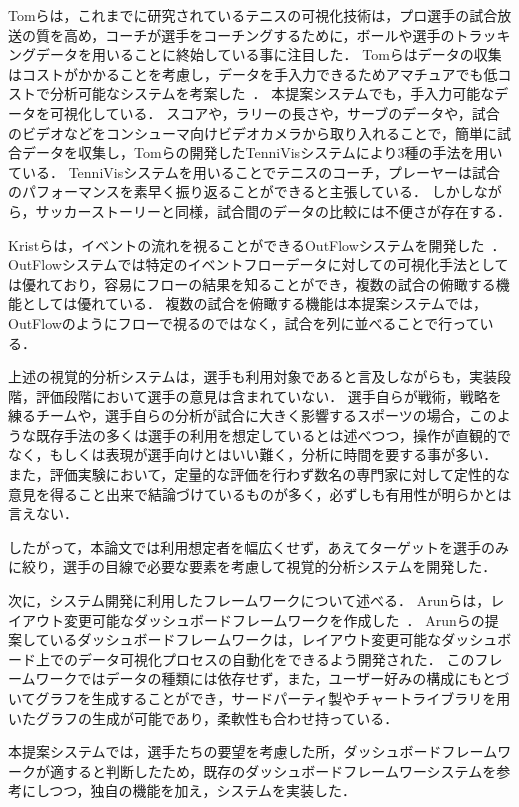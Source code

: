 \documentclass[sotsuron]{kuee}
\begin{document}
	Tomらは，これまでに研究されているテニスの可視化技術は，プロ選手の試合放送の質を高め，コーチが選手をコーチングするために，ボールや選手のトラッキングデータを用いることに終始している事に注目した．
	Tomらはデータの収集はコストがかかることを考慮し，データを手入力できるためアマチュアでも低コストで分析可能なシステムを考案した~\cite{TenniVis}．
	本提案システムでも，手入力可能なデータを可視化している．
	スコアや，ラリーの長さや，サーブのデータや，試合のビデオなどをコンシューマ向けビデオカメラから取り入れることで，簡単に試合データを収集し，Tomらの開発したTenniVisシステムにより3種の手法を用いている．
	TenniVisシステムを用いることでテニスのコーチ，プレーヤーは試合のパフォーマンスを素早く振り返ることができると主張している．
	しかしながら，サッカーストーリーと同様，試合間のデータの比較には不便さが存在する．
	
	Kristらは，イベントの流れを視ることができるOutFlowシステムを開発した~\cite{Outflow}．
	OutFlowシステムでは特定のイベントフローデータに対しての可視化手法としては優れており，容易にフローの結果を知ることができ，複数の試合の俯瞰する機能としては優れている．
	複数の試合を俯瞰する機能は本提案システムでは，OutFlowのようにフローで視るのではなく，試合を列に並べることで行っている．

	上述の視覚的分析システムは，選手も利用対象であると言及しながらも，実装段階，評価段階において選手の意見は含まれていない．
	選手自らが戦術，戦略を練るチームや，選手自らの分析が試合に大きく影響するスポーツの場合，このような既存手法の多くは選手の利用を想定しているとは述べつつ，操作が直観的でなく，もしくは表現が選手向けとはいい難く，分析に時間を要する事が多い．
	また，評価実験において，定量的な評価を行わず数名の専門家に対して定性的な意見を得ること出来で結論づけているものが多く，必ずしも有用性が明らかとは言えない．
	
	したがって，本論文では利用想定者を幅広くせず，あえてターゲットを選手のみに絞り，選手の目線で必要な要素を考慮して視覚的分析システムを開発した．
	
	次に，システム開発に利用したフレームワークについて述べる．	
	Arunらは，レイアウト変更可能なダッシュボードフレームワークを作成した~\cite{dashboard}．
	Arunらの提案しているダッシュボードフレームワークは，レイアウト変更可能なダッシュボード上でのデータ可視化プロセスの自動化をできるよう開発された．
	このフレームワークではデータの種類には依存せず，また，ユーザー好みの構成にもとづいてグラフを生成することができ，サードパーティ製やチャートライブラリを用いたグラフの生成が可能であり，柔軟性も合わせ持っている．
	
	本提案システムでは，選手たちの要望を考慮した所，ダッシュボードフレームワークが適すると判断したため，既存のダッシュボードフレームワーシステムを参考にしつつ，独自の機能を加え，システムを実装した．
\end{document}
